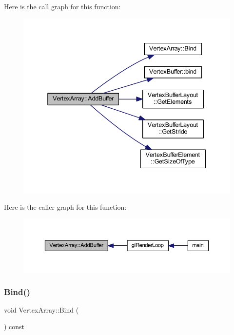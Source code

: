 Here is the call graph for this function\+:
\nopagebreak
\begin{figure}[H]
\begin{center}
\leavevmode
\includegraphics[width=338pt]{class_vertex_array_a994a9dc780ecc0c725b0814a9e7ab532_cgraph}
\end{center}
\end{figure}
Here is the caller graph for this function\+:
\nopagebreak
\begin{figure}[H]
\begin{center}
\leavevmode
\includegraphics[width=350pt]{class_vertex_array_a994a9dc780ecc0c725b0814a9e7ab532_icgraph}
\end{center}
\end{figure}
\mbox{\label{class_vertex_array_ad5059455f0864327028636c628d5a661}} 
\subsubsection{\texorpdfstring{Bind()}{Bind()}}
{\footnotesize\ttfamily void Vertex\+Array\+::\+Bind (\begin{DoxyParamCaption}{ }\end{DoxyParamCaption}) const}

